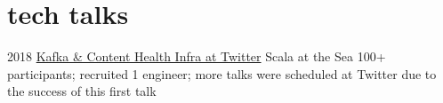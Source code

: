 \documentclass[]{friggeri-cv-a4}
\begin{document}
\section{tech talks}
\begin{entrylist}


\entry
{2018}
{\href{https://www.meetup.com/Seattle-Scala-User-Group/events/tmkmjpyxnbmb/}{Kafka \& Content Health Infra at Twitter}}
{Scala at the Sea}
{100+ participants; recruited 1 engineer; more talks were scheduled at Twitter due to the success of this first talk}

\end{entrylist}
\end{document}
